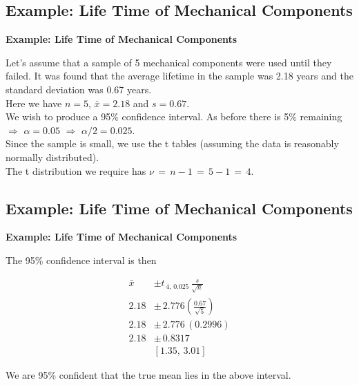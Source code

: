 \documentclass[compress]{beamer}        %
\makeatletter
\newcommand{\tcb}{\textcolor{beamer@blendedblue}}
\makeatother
\begin{document}
\subsection{Example: Life Time of Mechanical Components}
\begin{frame}{\bf \tcb{Example: Life Time of Mechanical Components}}

Let's assume that a sample of 5 mechanical components were used until they failed. It was found that the average lifetime in the sample was 2.18 years and the standard deviation was 0.67 years.\\[0.8cm]

Here we have $n=5$, $\bar x = 2.18$ and $s = 0.67$.\\[0.5cm]

We wish to produce a 95\% confidence interval. As before there is 5\% remaining $\Rightarrow$ $\alpha=0.05$ $\Rightarrow$ $\alpha/2 = 0.025$.\\[0.4cm]

Since the sample is small, we use the t tables (assuming the data is reasonably normally distributed).\\[0.5cm]

The t distribution we require has $\nu \, = \, n - 1 \,=\, 5 - 1 \,=\, 4$.

\end{frame}


\subsection{Example: Life Time of Mechanical Components}
\begin{frame}{\bf \tcb{Example: Life Time of Mechanical Components}}

The 95\% confidence interval is then

\begin{align*}
\bar x &\pm t_{\,4,\,0.025} \, \frac{s}{\sqrt{n}}\\[0.3cm]
2.18 &\pm  \, 2.776 \left(\frac{0.67}{\sqrt{5}}\right)\\[0.3cm]
2.18 &\pm  \, 2.776 \, (0.2996)\\[0.3cm]
2.18 &\pm  \, 0.8317\\[0.3cm]
&[1.35,\,3.01]
\end{align*}

We are 95\% confident that the true mean lies in the above interval.

\end{frame}
\end{document}
